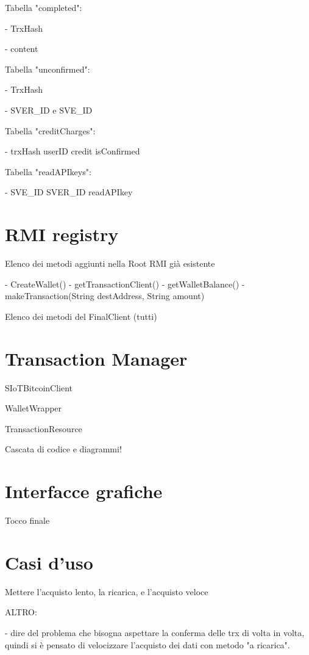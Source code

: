 Tabella "completed":

- TrxHash

- content

Tabella "unconfirmed":

- TrxHash

- SVER\_ID e SVE\_ID

Tabella "creditCharges":

- trxHash 	userID 	credit 	isConfirmed 

Tabella "readAPIkeys":

- SVE\_ID   SVER\_ID   readAPIkey

\section{RMI registry}
\label{c:integr:rmi}

Elenco dei metodi aggiunti nella Root RMI già esistente

- CreateWallet()
- getTransactionClient()
- getWalletBalance()
- makeTransaction(String destAddress, String amount)

Elenco dei metodi del FinalClient (tutti)

\section{Transaction Manager}
\label{c:integr:trxmanager}

SIoTBitcoinClient

WalletWrapper

TransactionResource


Cascata di codice e diagrammi!

\section{Interfacce grafiche}
\label{c:integr:gui}

Tocco finale




\section{Casi d'uso}
\label{c:integr:useCase}

Mettere l'acquisto lento, la ricarica, e l'acquisto veloce


ALTRO:

- dire del problema che bisogna aspettare la conferma delle trx di volta in volta, quindi si è pensato di velocizzare l'acquisto dei dati con metodo "a ricarica".
